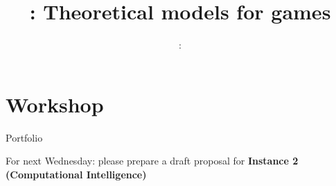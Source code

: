 \usepackage{../../beamerthemeFalmouthGamesAcademy}
\usepackage{multimedia}
\graphicspath{ {../../} }


\usepackage[normalem]{ulem}
\usepackage{wasysym}

\usepackage[noend]{algpseudocode}
\usepackage{pdfpages}

\usetikzlibrary{arrows,automata}



\hypersetup{
pdftex,
pdftitle=\sessionnumber: Theoretical models for games,
pdfauthor=Ed Powley,
pdfdisplaydoctitle,
pdflang=en-GB
}


\title{\sessionnumber: Theoretical models for games}
\subtitle{\modulecode: \moduletitle}

\frame{\titlepage} 






\part{Workshop}
\frame{\partpage}

\begin{frame}{Portfolio}
    \begin{center}
        For next Wednesday: please prepare a draft proposal for \textbf{Instance 2 (Computational Intelligence)}
    \end{center}
\end{frame}


